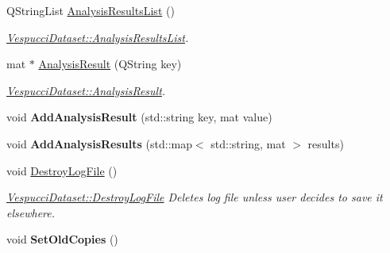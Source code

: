 \begin{DoxyCompactItemize}
\item 
Q\+String\+List \hyperlink{class_vespucci_dataset_af65d31aaea6c890d5e3236b1f05a40c1}{Analysis\+Results\+List} ()
\begin{DoxyCompactList}\small\item\em \hyperlink{class_vespucci_dataset_af65d31aaea6c890d5e3236b1f05a40c1}{Vespucci\+Dataset\+::\+Analysis\+Results\+List}. \end{DoxyCompactList}\item 
mat $\ast$ \hyperlink{class_vespucci_dataset_a3d0aabb4b4b9d66da5ae66373d04de7b}{Analysis\+Result} (Q\+String key)
\begin{DoxyCompactList}\small\item\em \hyperlink{class_vespucci_dataset_a3d0aabb4b4b9d66da5ae66373d04de7b}{Vespucci\+Dataset\+::\+Analysis\+Result}. \end{DoxyCompactList}\item 
\hypertarget{class_vespucci_dataset_a16a6d1595d8b4afd96789d09d55a6954}{void {\bfseries Add\+Analysis\+Result} (std\+::string key, mat value)}\label{class_vespucci_dataset_a16a6d1595d8b4afd96789d09d55a6954}

\item 
\hypertarget{class_vespucci_dataset_acbaac5a3d06cd1f331abee2714e5734f}{void {\bfseries Add\+Analysis\+Results} (std\+::map$<$ std\+::string, mat $>$ results)}\label{class_vespucci_dataset_acbaac5a3d06cd1f331abee2714e5734f}

\item 
\hypertarget{class_vespucci_dataset_aca08389cff2f9aa5c0bfb5d41adbc994}{void \hyperlink{class_vespucci_dataset_aca08389cff2f9aa5c0bfb5d41adbc994}{Destroy\+Log\+File} ()}\label{class_vespucci_dataset_aca08389cff2f9aa5c0bfb5d41adbc994}

\begin{DoxyCompactList}\small\item\em \hyperlink{class_vespucci_dataset_aca08389cff2f9aa5c0bfb5d41adbc994}{Vespucci\+Dataset\+::\+Destroy\+Log\+File} Deletes log file unless user decides to save it elsewhere. \end{DoxyCompactList}\item 
\hypertarget{class_vespucci_dataset_ab092b6f1366082df96091fdd3eb5fcfb}{void {\bfseries Set\+Old\+Copies} ()}\label{class_vespucci_dataset_ab092b6f1366082df96091fdd3eb5fcfb}

\end{DoxyCompactItemize}
